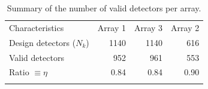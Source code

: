 
\begin{table}[!htbp]
  \begin{center}
    \caption[Number of detectors]{Summary of the number of valid detectors per array.}
    \label{tab:number_of_kids}  
    \begin{tabular}{lrrr}
      \hline
      \hline
      \noalign{\smallskip}
      Characteristics & Array 1 & Array 3  & Array 2  \\
      \noalign{\smallskip}
      \hline
      \noalign{\smallskip}
      Design detectors ($N_k$)  & 1140  & 1140   & 616  \\
      Valid detectors             & 952   & 961    & 553  \\ 
      Ratio $\equiv \eta$         & 0.84  & 0.84   & 0.90   \\
      \noalign{\smallskip}
      \hline
    \end{tabular}
  \end{center}    
\end{table}

